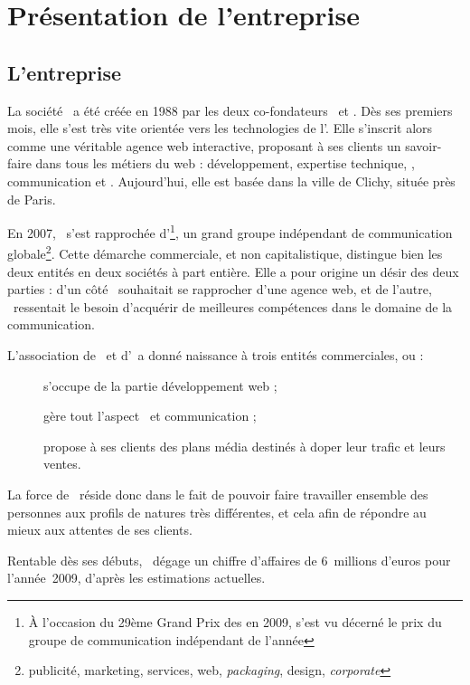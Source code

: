 \chapter{Présentation de l'entreprise}

\section{L'entreprise \asensio}

La société \asensio\ a été créée en 1988 par les deux co-fondateurs \apotencier\ et \apascal. Dès ses premiers mois, elle s'est très vite orientée vers les technologies de l'\ainternet. Elle s'inscrit alors comme une véritable agence web interactive, proposant à ses clients un savoir-faire dans tous les métiers du web : développement, expertise technique, \awm, communication et \awd. Aujourd'hui, elle est basée dans la ville de Clichy, située près de Paris.

En 2007, \asensio\ s'est rapprochée d'\aextreme\footnote{À l'occasion du 29ème Grand Prix des \aagencesannee en 2009, \aextreme s'est vu décerné le prix du groupe de communication indépendant de l'année}, un grand groupe indépendant de communication globale\footnote{publicité, marketing, services, web, \textit{packaging}, design, \textit{corporate}}. Cette démarche commerciale, et non capitalistique, distingue bien les deux entités en deux sociétés à part entière. Elle a pour origine un désir des deux parties : d'un côté \aextreme\ souhaitait se rapprocher d'une agence web, et de l'autre, \asensio\ ressentait le besoin d'acquérir de meilleures compétences dans le domaine de la communication.

L'association de \asensio\ et d'\aextreme\ a donné naissance à trois entités commerciales, ou \abusfull :

\begin{description}
	\item[\asl] s'occupe de la partie développement web ;
	\item[\aes] gère tout l'aspect \awm\ et communication ;
	\item[\aesm] propose à ses clients des plans média destinés à doper leur trafic et leurs ventes.
\end{description}

La force de \asensio\ réside donc dans le fait de pouvoir faire travailler ensemble des personnes aux profils de natures très différentes, et cela afin de répondre au mieux aux attentes de ses clients.

Rentable dès ses débuts, \asensio\ dégage un chiffre d'affaires de 6~millions d'euros pour l'année~2009, d'après les estimations actuelles.


